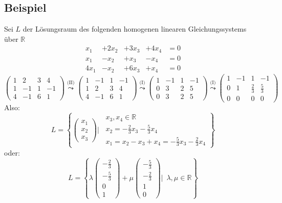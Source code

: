 \subsection{Beispiel} %
\label{sub:beispiel}
Sei $L$ der Lösungsraum des folgenden homogenen linearen Gleichungssystems über $\mathds{R}$
\[
\begin{array}{lllll}
x_1 &+ 2x_2 &+ 3x_3 &+ 4x_4 &= 0 \\
x_1 &- x_2 &+ x_3 &- x_4 &= 0 \\
4 x_1 &- x_2 &+ 6 x_3 &+ x_4 &= 0
\end{array}
\]
\[
	\begin{pmatrix}
	1 & 2 & 3 & 4 \\
	1 & -1 & 1 & -1 \\
	4 & -1 & 6 & 1 
	\end{pmatrix}
	\overset{\text{(II)}}{\leadsto}
	\begin{pmatrix}
	1 & -1 & 1 & -1 \\
	1 & 2 & 3 & 4 \\
	4 & -1 & 6 & 1 
	\end{pmatrix}
	\overset{\text{(I)}}{\leadsto}
	\begin{pmatrix}
	1 & -1 & 1 & -1 \\
	0 & 3 & 2 & 5 \\
	0 & 3 & 2 & 5 
	\end{pmatrix}
	\overset{\text{(I)}}{\leadsto}
	\begin{pmatrix}
	1 & -1 & 1 & -1 \\
	0 & 1 & \frac{2}{3} & \frac{5}{3} \\
	0 & 0 & 0 & 0 
	\end{pmatrix}
\]
Also:
\[
	L=
	\left\{
	\begin{pmatrix}
		x_1 \\ x_2 \\x_3
	\end{pmatrix}
	\Bigg| \enspace
	\begin{matrix}
		x_3 , x_4 \in \mathds{R} \\
		x_2 = - \frac{2}{3} x_3 -\frac{5}{3} x_4 \\
		x_1 = x_2 -x_3 +x_4 = - \frac{5}{3} x_3 - \frac{2}{3} x_4
	\end{matrix}
	\right\}
\]
oder:
\[
	L = \left\{
	\lambda 
	\begin{pmatrix}
		- \frac{2}{3} \\ - \frac{5}{3} \\ 0 \\ 1
	\end{pmatrix}
	+ \mu
	\begin{pmatrix}
		- \frac{5}{3} \\ - \frac{2}{3} \\ 1 \\ 0
	\end{pmatrix}
	\Bigg| \enspace
	\lambda , \mu  \in \mathds{R}
	\right\}
\]
